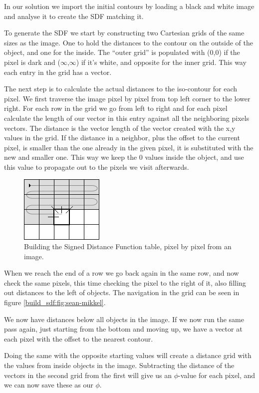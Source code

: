 In our solution we import the initial contours by loading a black and
white image and analyse it to create the SDF matching it. 

To generate the SDF we start by constructing two Cartesian grids of
the same sizes as the image. One to hold the distances to the contour
on the outside of the object, and one for the inside. The ``outer
grid'' is populated with (0,0) if the pixel is dark and
($\infty$,$\infty$) if it's white, and opposite for the inner
grid. This way each entry in the grid has a vector.

The next step is to calculate the actual distances to the iso-contour
for each pixel. We first traverse the image pixel by pixel from top
left corner to the lower right. For each row in the grid we go from
left to right and for each pixel calculate the length of our vector in
this entry against all the neighboring pixels vectors. The distance is
the vector length of the vector created with the x,y values in the
grid. If the distance in a neighbor, plus the offset to the current
pixel, is smaller than the one already in the given pixel, it is
substituted with the new and smaller one. This way we keep the 0
values inside the object, and use this value to propagate out to the
pixels we visit afterwards.

\begin{figure}[htb]
  \centering
  \includegraphics[scale=0.8]{imgs/sean-mikkel.png}
  \caption{Building the Signed Distance Function table, pixel by pixel from an image.}
  \label{build_sdf:fig:sean-mikkel}
\end{figure}

When we reach the end of a row we go back again in the same row, and
now check the same pixels, this time checking the pixel to the right
of it, also filling out distances to the left of objects. The
navigation in the grid can be seen in
figure \vref{build_sdf:fig:sean-mikkel}.

We now have distances below all objects in the image. If we now run
the same pass again, just starting from the bottom and moving up, we
have a vector at each pixel with the offset to the nearest contour.

Doing the same with the opposite starting values will create a
distance grid with the values from inside objects in the
image. Subtracting the distance of the vectors in the second grid
from the first will give us an $\phi$-value for each pixel, and we can
now save these as our $\phi$.


